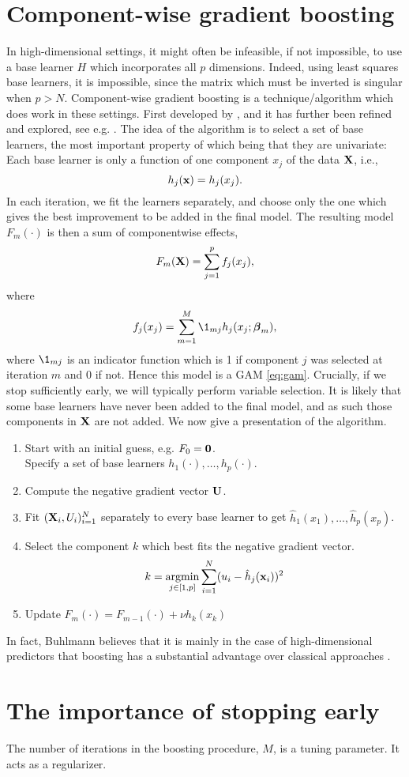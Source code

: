 \section{Component-wise gradient boosting}
In high-dimensional settings, it might often be infeasible, if not impossible, to use a base learner $H$ which incorporates all $p$ dimensions. Indeed, using least squares base learners, it is impossible, since the matrix which must be inverted is singular when $p>N$. Component-wise gradient boosting is a technique/algorithm which does work in these settings. First developed by \cite{buhlmann-yu}, and it has further been refined and explored, see e.g. \cite{buhlmann2006}. The idea of the algorithm is to select a set of base learners, the most important property of which being that they are univariate: Each base learner is only a function of one component $x_j$ of the data $\mathbf{X}$, i.e.,
\begin{equation*}
    h_j(\mathbf{x})=h_j(x_j).
\end{equation*}
In each iteration, we fit the learners separately, and choose only the one which gives the best improvement to be added in the final model. The resulting model $F_m(\cdot)$ is then a sum of componentwise effects,
\begin{equation*}
    F_m(\mathbf{X})=\sum_{j=1}^pf_j(x_j),
\end{equation*}
where
\begin{equation*}
    f_j(x_j)=\sum_{m=1}^M\1_{mj}h_j(x_j;\bbeta_m),
\end{equation*}
where $\1_{mj}$ is an indicator function which is 1 if component $j$ was selected at iteration $m$ and 0 if not.
Hence this model is a GAM \eqref{eq:gam}. Crucially, if we stop sufficiently early, we will typically perform variable selection. It is likely that some base learners have never been added to the final model, and as such those components in $\mathbf{X}$ are not added. We now give a presentation of the algorithm.
\begin{enumerate}
    \item Start with an initial guess, e.g. $F_0=\mathbf{0}$.\\
    Specify a set of base learners $h_1(\cdot),\dotsc,h_p(\cdot)$.
    \item Compute the negative gradient vector $\mathbf{U}$.
    \item Fit $(\mathbf{X}_i,U_i)_{i=1}^N$ separately to every base learner to get $\hat{h}_1(x_1),\dotsc,\hat{h}_p(x_p)$.
    \item Select the component $k$ which best fits the negative gradient vector.
        \begin{equation*}
            k=\operatorname*{argmin}_{j\in[1,p]}\sum_{i=1}^N(u_i-\hat{h}_j(\mathbf{x}_i))^2
        \end{equation*}
    \item Update $F_m(\cdot)=F_{m-1}(\cdot)+\nu h_k(x_k)$
\end{enumerate}
In fact, Buhlmann believes that it is mainly in the case of high-dimensional predictors that boosting has a substantial advantage over classical approaches \citep{buhlmann2006}.

\section{The importance of stopping early}
The number of iterations in the boosting procedure, $M$, is a tuning parameter. It acts as a regularizer.